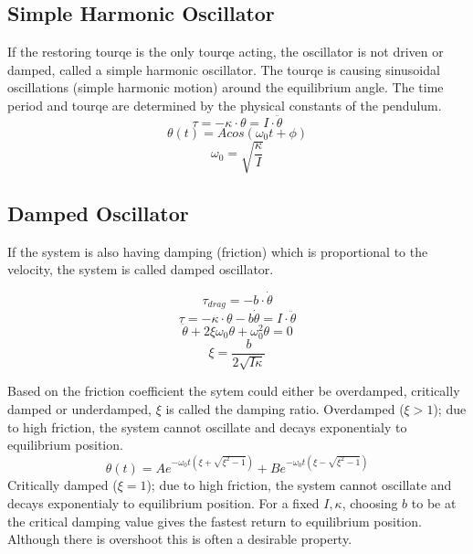 \documentclass[\main/master.tex]{subfiles}
\begin{document}
\subsection{Simple Harmonic Oscillator}
If the restoring tourqe is the only tourqe acting, the oscillator is not driven or damped, called a simple harmonic oscillator. The tourqe is causing sinusoidal oscillations (simple harmonic motion) around the equilibrium angle. The time period and tourqe are determined by the physical constants of the pendulum. 
\begin{equation}
\tau = -\kappa\cdot\theta  = I\cdot\ddot{\theta}   \label{eqn:undamped_motion_equation}
\end{equation}
\begin{equation}
\theta(t) = Acos(\omega_0 t +\phi)    \label{eqn:undamped_motion_equation}
\end{equation}
\begin{equation}
\omega_0  =  \sqrt{\frac{\kappa}{I}}   \label{eqn:undamped_motion_equation}
\end{equation}

\subsection{Damped Oscillator}
If the system is also having damping (friction) which is proportional to the velocity, the system is called damped oscillator.


\begin{equation}
\tau_{drag} = -b\cdot\dot{\theta}   \label{eqn:friction_tourqe}
\end{equation} 
\begin{equation}
\tau = -\kappa\cdot\theta - b\dot{\theta}  = I\cdot\ddot{\theta}   \label{eqn:damped_motion_equation}
\end{equation} 
\begin{equation}
\ddot{\theta} + 2\xi\omega_0\dot{\theta} + \omega_0^2\theta = 0   \label{eqn:damped_motion_equation}
\end{equation}
\begin{equation}
\xi = \frac{b}{2\sqrt{I\kappa}}   \label{eqn:damped_motion_equation}
\end{equation}

Based on the friction coefficient the sytem could either be overdamped, critically damped or underdamped, $\xi$ is called the damping ratio. Overdamped ($\xi > 1$); due to high friction, the system cannot oscillate and decays exponentialy to equilibrium position.
\begin{equation}
\theta(t) = Ae^{-\omega_0 t(\xi+\sqrt{\xi^2-1})} + Be^{-\omega_0 t(\xi-\sqrt{\xi^2-1})}    \label{eqn:overdamped_motion_equation}
\end{equation}
Critically damped ($\xi = 1$); due to high friction, the system cannot oscillate and decays exponentialy to equilibrium position. For a fixed $I, \kappa$, choosing $b$ to be at the critical damping value gives
the fastest return to equilibrium position. Although there is overshoot this is often a desirable property.
\end{document}
